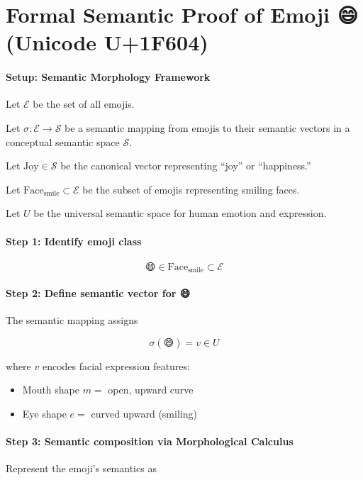 \documentclass{article}
\begin{document}
\section*{Formal Semantic Proof of Emoji 😄 (Unicode U+1F604)}

\paragraph{Setup: Semantic Morphology Framework}

Let $\mathcal{E}$ be the set of all emojis.

Let $\sigma : \mathcal{E} \to \mathcal{S}$ be a semantic mapping from emojis to their semantic vectors in a conceptual semantic space $\mathcal{S}$.

Let $\mathrm{Joy} \in \mathcal{S}$ be the canonical vector representing ``joy'' or ``happiness.''

Let $\mathrm{Face}_{\mathrm{smile}} \subset \mathcal{E}$ be the subset of emojis representing smiling faces.

Let $U$ be the universal semantic space for human emotion and expression.

\paragraph{Step 1: Identify emoji class}

\[
\text{😄} \in \mathrm{Face}_{\mathrm{smile}} \subset \mathcal{E}
\]

\paragraph{Step 2: Define semantic vector for 😄}

The semantic mapping assigns

\[
\sigma(\text{😄}) = v \in U
\]

where $v$ encodes facial expression features:  
\begin{itemize}
    \item Mouth shape $m = $ open, upward curve
    \item Eye shape $e = $ curved upward (smiling)
\end{itemize}

\paragraph{Step 3: Semantic composition via Morphological Calculus}

Represent the emoji's semantics as
\end{document}
